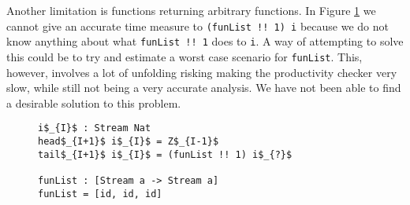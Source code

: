 Another limitation is functions returning arbitrary functions. In Figure \ref{fig:funList} we cannot give an accurate time measure to \texttt{(funList !! 1) i} because we do not know anything about what \texttt{funList !! 1} does to \texttt{i}. A way of attempting to solve this could be to try and estimate a worst case scenario for \texttt{funList}. This, however, involves a lot of unfolding risking making the productivity checker very slow, while still not being a very accurate analysis. We have not been able to find a desirable solution to this problem.

\begin{figure}
\begin{Verbatim}[commandchars=\\\{\},codes={\catcode`$=3\catcode`_=8}]
i$_{I}$ : Stream Nat
head$_{I+1}$ i$_{I}$ = Z$_{I-1}$
tail$_{I+1}$ i$_{I}$ = (funList !! 1) i$_{?}$

funList : [Stream a -> Stream a]
funList = [id, id, id]
\end{Verbatim}
\caption{}
\label{fig:funList}
\end{figure}